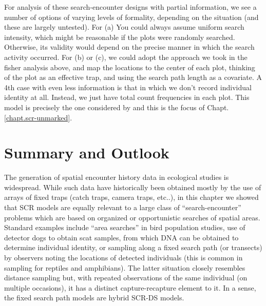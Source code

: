 For analysis of these search-encounter designs with partial information,
we see a number of options of varying levels of formality,
depending on the situation (and these are largely untested).
For (a) You could always assume uniform search intensity,
which might be reasonable if the plots were randomly
searched. Otherwise, its validity would depend on the precise manner
in which the search activity occurred.
For (b) or (c), we could adopt the approach we took in the fisher analysis
above, and  map the locations to the center of each plot, thinking of
the plot as an effective trap, and using the search path length
as a covariate.
A 4th case with  even less information is that in which
we don't record individual identity at all. Instead,
we just have total count frequencies in each plot.
This model is precisely the one considered by
\citep{chandler_royle:2012} and this is the focus of
Chapt. \ref{chapt.scr-unmarked}.






\section{Summary and Outlook}

The generation of spatial encounter history data in ecological studies
is widespread. While such data have historically been obtained mostly
by the use of arrays of fixed traps (catch traps, camera traps,
etc..), in this chapter we showed that SCR models are equally relevant
to a large class of ``search-encounter'' problems which are based on
organized or opportunistic searches of spatial areas. Standard
examples include ``area searches'' in bird population studies, use of
detector dogs to obtain scat samples, from which DNA can be obtained
to determine individual identity, or sampling along a fixed search path
(or transects) by observers
noting the locations of detected individuals (this is common in
sampling for reptiles and amphibians).  The latter situation closely
resembles distance sampling but, with repeated observations of the
same individual (on multiple occasions), it has a distinct
capture-recapture element to it. In a sense, the fixed search path
models are hybrid SCR-DS models.

